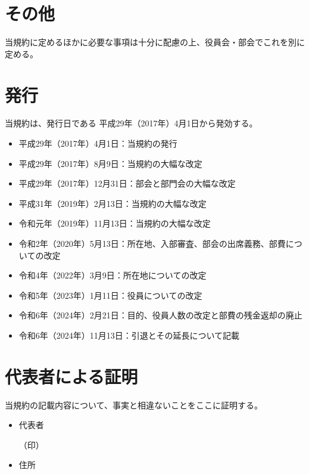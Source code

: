 \documentclass[12pt, unicode, a4paper]{ltjsreport}
\begin{document}
    \section*{その他}
        当規約に定めるほかに必要な事項は十分に配慮の上、役員会・部会でこれを別に定める。

    \section*{発行}
        当規約は、発行日である 平成29年（2017年）4月1日から発効する。
        \begin{itemize}
            \item 平成29年（2017年）4月1日：当規約の発行
            \item 平成29年（2017年）8月9日：当規約の大幅な改定
            \item 平成29年（2017年）12月31日：部会と部門会の大幅な改定
            \item 平成31年（2019年）2月13日：当規約の大幅な改定
            \item 令和元年（2019年）11月13日：当規約の大幅な改定
            \item 令和2年（2020年）5月13日：所在地、入部審査、部会の出席義務、部費についての改定
            \item 令和4年（2022年）3月9日：所在地についての改定
            \item 令和5年（2023年）1月11日：役員についての改定
            \item 令和6年（2024年）2月21日：目的、役員人数の改定と部費の残金返却の廃止
            \item 令和6年（2024年）11月13日：引退とその延長について記載
        \end{itemize}

    \section*{代表者による証明}
        当規約の記載内容について、事実と相違ないことをここに証明する。
        \begin{itemize}
            \item 代表者
            \begin{flushright}
                （印）
            \end{flushright}
            \item 住所
        \end{itemize}
\end{document}
